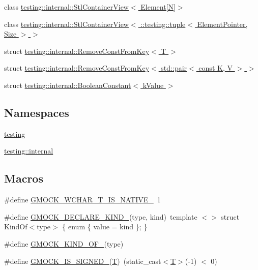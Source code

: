 \begin{DoxyCompactItemize}
\item 
class \hyperlink{classtesting_1_1internal_1_1_stl_container_view_3_01_element[_n]_4}{testing\+::internal\+::\+Stl\+Container\+View$<$ Element\mbox{[}\+N\mbox{]}$>$}
\item 
class \hyperlink{classtesting_1_1internal_1_1_stl_container_view_3_01_1_1testing_1_1tuple_3_01_element_pointer_00_01_size_01_4_01_4}{testing\+::internal\+::\+Stl\+Container\+View$<$ \+::testing\+::tuple$<$ Element\+Pointer, Size $>$ $>$}
\item 
struct \hyperlink{structtesting_1_1internal_1_1_remove_const_from_key}{testing\+::internal\+::\+Remove\+Const\+From\+Key$<$ T $>$}
\item 
struct \hyperlink{structtesting_1_1internal_1_1_remove_const_from_key_3_01std_1_1pair_3_01const_01_k_00_01_v_01_4_01_4}{testing\+::internal\+::\+Remove\+Const\+From\+Key$<$ std\+::pair$<$ const K, V $>$ $>$}
\item 
struct \hyperlink{structtesting_1_1internal_1_1_boolean_constant}{testing\+::internal\+::\+Boolean\+Constant$<$ k\+Value $>$}
\end{DoxyCompactItemize}
\subsection*{Namespaces}
\begin{DoxyCompactItemize}
\item 
 \hyperlink{namespacetesting}{testing}
\item 
 \hyperlink{namespacetesting_1_1internal}{testing\+::internal}
\end{DoxyCompactItemize}
\subsection*{Macros}
\begin{DoxyCompactItemize}
\item 
\#define \hyperlink{gmock-internal-utils_8h_a0725bd2b3326d282677e5197e53cc5e9}{G\+M\+O\+C\+K\+\_\+\+W\+C\+H\+A\+R\+\_\+\+T\+\_\+\+I\+S\+\_\+\+N\+A\+T\+I\+V\+E\+\_\+}~1
\item 
\#define \hyperlink{gmock-internal-utils_8h_a7d8a1871d7a30543a4e1882a8b2bbcd8}{G\+M\+O\+C\+K\+\_\+\+D\+E\+C\+L\+A\+R\+E\+\_\+\+K\+I\+N\+D\+\_\+}(type,  kind)~template $<$$>$ struct Kind\+Of$<$type$>$ \{ enum \{ value = kind \}; \}
\item 
\#define \hyperlink{gmock-internal-utils_8h_a72b01bdd08b78e927270885ca880ead4}{G\+M\+O\+C\+K\+\_\+\+K\+I\+N\+D\+\_\+\+O\+F\+\_\+}(type)
\item 
\#define \hyperlink{gmock-internal-utils_8h_a8ee49a1af821b48fd83849c050d0d5a2}{G\+M\+O\+C\+K\+\_\+\+I\+S\+\_\+\+S\+I\+G\+N\+E\+D\+\_\+}(\hyperlink{functions__7_8js_adf1f3edb9115acb0a1e04209b7a9937b}{T})~(static\+\_\+cast$<$\hyperlink{functions__7_8js_adf1f3edb9115acb0a1e04209b7a9937b}{T}$>$(-\/1) $<$ 0)
\end{DoxyCompactItemize}
